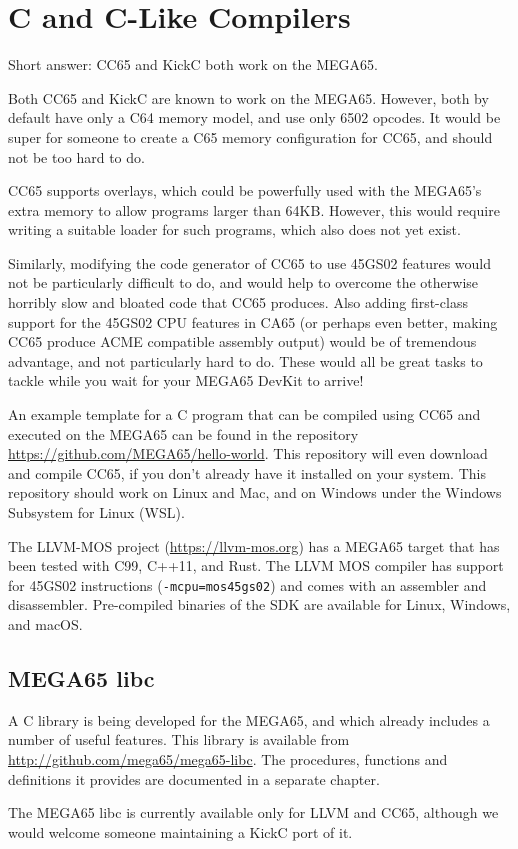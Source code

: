 \chapter{C and C-Like Compilers}

Short answer: CC65 and KickC both work on the MEGA65.

Both CC65 and KickC are known to work on the MEGA65.  However, both by
default have only a C64 memory model, and use only 6502 opcodes.
It would be super for someone to create a C65 memory configuration for
CC65, and should not be too hard to do.

CC65 supports overlays, which
could be powerfully used with the MEGA65's extra memory to allow
programs larger than 64KB.  However, this would require writing a
suitable loader for such programs, which also does not yet exist.

Similarly, modifying the code
generator of CC65 to use 45GS02 features would not be particularly
difficult to do, and would help to overcome the otherwise horribly
slow and bloated code that CC65 produces.  Also adding first-class
support for the 45GS02 CPU features in CA65 (or perhaps even better,
making CC65 produce ACME compatible assembly output) would be of
tremendous advantage, and not particularly hard to do.  These would
all be great tasks to tackle while you wait for your MEGA65 DevKit to
arrive!

An example template for a C program that can be compiled using CC65
and executed on the MEGA65 can be found in the repository
\url{https://github.com/MEGA65/hello-world}.  This repository will
even download and compile CC65, if you don't already have it installed
on your system.  This repository should work on Linux and Mac, and
on Windows under the Windows Subsystem for Linux (WSL).

The LLVM-MOS project (\url{https://llvm-mos.org}) has
a MEGA65 target that has been tested with C99, C++11, and Rust.
The LLVM MOS compiler has support for 45GS02 instructions
(\texttt{-mcpu=mos45gs02}) and comes with an assembler and disassembler.
Pre-compiled binaries of the SDK are available for Linux, Windows, and macOS.

\section{MEGA65 libc}

A C library is being developed for the MEGA65, and which already
includes a number of useful features. This library is available from
\url{http://github.com/mega65/mega65-libc}. The procedures,
functions and definitions it provides are documented in a separate
chapter.

The MEGA65 libc is currently available only for LLVM and CC65, although we would
welcome someone maintaining a KickC port of it.
